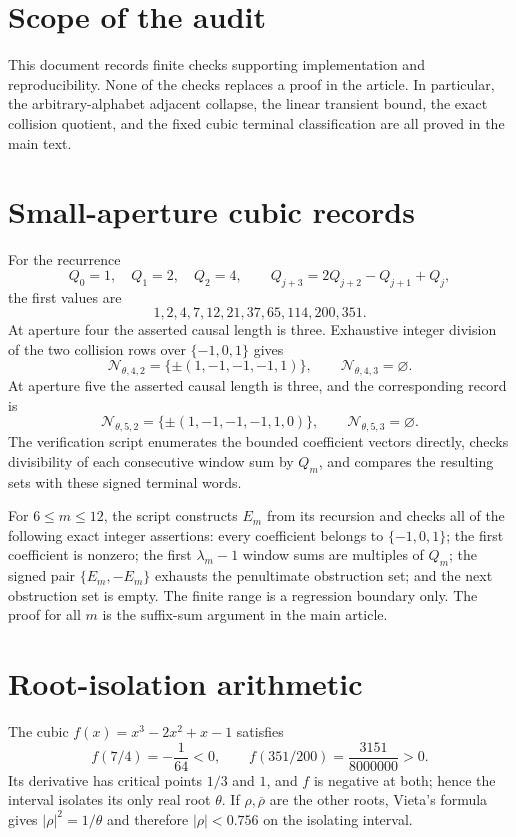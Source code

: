 \section{Scope of the audit}

This document records finite checks supporting implementation and
reproducibility.  None of the checks replaces a proof in the article.  In
particular, the arbitrary-alphabet adjacent collapse, the linear transient
bound, the exact collision quotient, and the fixed cubic terminal
classification are all proved in the main text.

\section{Small-aperture cubic records}

For the recurrence
\[
Q_0=1,\quad Q_1=2,\quad Q_2=4,\qquad
Q_{j+3}=2Q_{j+2}-Q_{j+1}+Q_j,
\]
the first values are
\[
1,2,4,7,12,21,37,65,114,200,351.
\]
At aperture four the asserted causal length is three.  Exhaustive integer
division of the two collision rows over $\{-1,0,1\}$ gives
\[
\mathcal N_{\theta,4,2}
=\{\pm(1,-1,-1,-1,1)\},
\qquad
\mathcal N_{\theta,4,3}=\varnothing.
\]
At aperture five the asserted causal length is three, and the corresponding
record is
\[
\mathcal N_{\theta,5,2}
=\{\pm(1,-1,-1,-1,1,0)\},
\qquad
\mathcal N_{\theta,5,3}=\varnothing.
\]
The verification script enumerates the bounded coefficient vectors directly,
checks divisibility of each consecutive window sum by $Q_m$, and compares
the resulting sets with these signed terminal words.

For $6\le m\le12$, the script constructs $E_m$ from its recursion and checks
all of the following exact integer assertions: every coefficient belongs to
$\{-1,0,1\}$; the first coefficient is nonzero; the first
$\lambda_m-1$ window sums are multiples of $Q_m$; the signed pair
$\{E_m,-E_m\}$ exhausts the penultimate obstruction set; and the next
obstruction set is empty.  The finite range is a regression boundary only.
The proof for all $m$ is the suffix-sum argument in the main article.

\section{Root-isolation arithmetic}

The cubic $f(x)=x^3-2x^2+x-1$ satisfies
\[
f(7/4)=-\frac1{64}<0,
\qquad
f(351/200)=\frac{3151}{8000000}>0.
\]
Its derivative has critical points $1/3$ and $1$, and $f$ is negative at
both; hence the interval isolates its only real root $\theta$.  If
$\rho,\overline\rho$ are the other roots, Vieta's formula gives
$|\rho|^2=1/\theta$ and therefore $|\rho|<0.756$ on the isolating interval.

